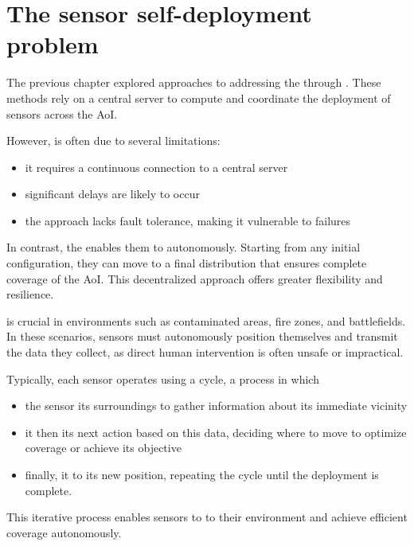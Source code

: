 \documentclass[a4paper, 12pt]{report}
\begin{document}
    \chapter{The sensor self-deployment problem}

    The previous chapter explored approaches to addressing the  through . These methods rely on a central server to compute and coordinate the deployment of sensors across the AoI.

    However,  is often  due to several limitations:  

    \begin{itemize}
        \item it requires a continuous connection to a central server
        \item significant delays are likely to occur
        \item the approach lacks fault tolerance, making it vulnerable to failures
    \end{itemize}

    In contrast, the  enables them to  autonomously. Starting from any initial configuration, they can move to a final distribution that ensures complete coverage of the AoI. This decentralized approach offers greater flexibility and resilience.

     is crucial in  environments such as contaminated areas, fire zones, and battlefields. In these scenarios, sensors must autonomously position themselves and transmit the data they collect, as direct human intervention is often unsafe or impractical.  

    Typically, each sensor operates using a  cycle, a process in which

    \begin{itemize}
        \item the sensor  its surroundings to gather information about its immediate vicinity
        \item it then  its next action based on this data, deciding where to move to optimize coverage or achieve its objective
        \item finally, it  to its new position, repeating the cycle until the deployment is complete.  
    \end{itemize}

    This iterative process enables sensors to  to their environment and achieve efficient coverage autonomously.
\end{document}
